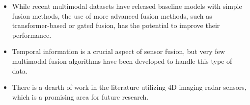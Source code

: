 \documentclass[rnd]{mas_proposal}
\begin{document}
\begin{itemize}
      \item While recent multimodal datasets have released baseline models with simple fusion methods, the use of more advanced fusion methods, such as transformer-based or gated fusion, has the potential to improve their performance.

      \item Temporal information is a crucial aspect of sensor fusion, but very few multimodal fusion algorithms have been developed to handle this type of data. \cite{bijelic2020seeing}

      \item There is a dearth of work in the literature utilizing 4D imaging radar sensors, which is a promising area for future research. \cite{Zhou2022May}



      

\end{itemize}
\end{document}

